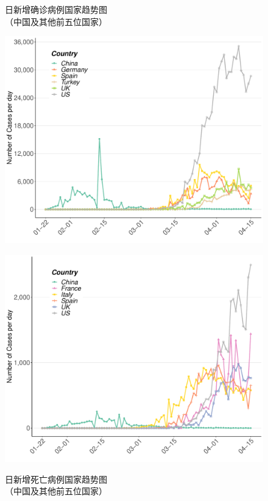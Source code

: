 \documentclass[]{article}
\begin{document}
\begin{figure}[H]
\centering
\begin{minipage}[b]{0.45\linewidth}
\caption{日新增确诊病例国家趋势图\\（中国及其他前五位国家）}
\includegraphics[]{./input/covid2.pdf}
\label{}
\end{minipage}
\quad
\begin{minipage}[b]{0.45\linewidth}
\caption{日新增死亡病例国家趋势图\\（中国及其他前五位国家） }
\includegraphics[]{./input/covid3.pdf}
\label{}
\end{minipage}
\end{figure}
\end{document}

